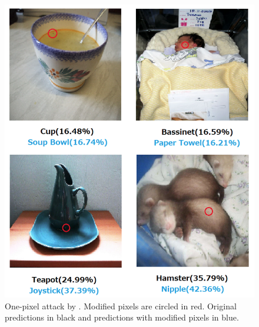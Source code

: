 \begin{figure}[ht]
    \centering
    \includegraphics[width=.8\linewidth]{Figures/intro/su_one_pixel.png}
    \caption{ One-pixel attack by \cite{su_one_2019}. Modified pixels are
        circled in red. Original predictions in black and predictions with
        modified pixels in blue.}
    \label{fig:su_one_pixel}
\end{figure}

